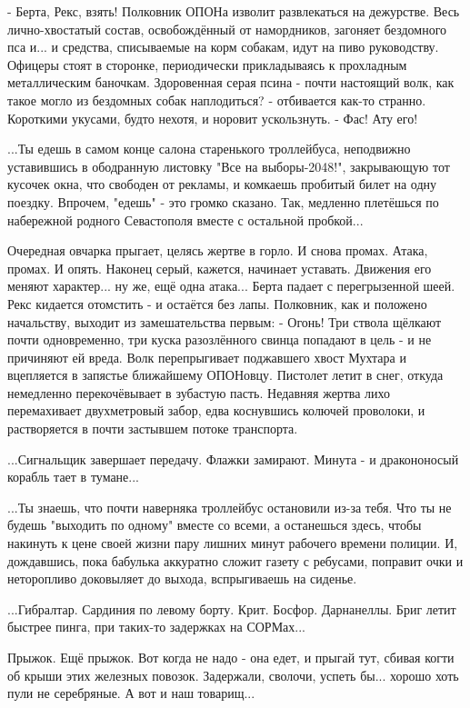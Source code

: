 

 - Берта, Рекс, взять!
Полковник ОПОНа изволит развлекаться на дежурстве. Весь лично-хвостатый состав, освобождённый от намордников, загоняет бездомного пса и... и средства, списываемые на корм собакам, идут на пиво руководству. Офицеры стоят в сторонке, периодически прикладываясь к прохладным металлическим баночкам. Здоровенная серая псина - почти настоящий волк, как такое могло из бездомных собак наплодиться? - отбивается как-то странно. Короткими укусами, будто нехотя, и норовит ускользнуть.
 - Фас! Ату его!


...Ты едешь в самом конце салона старенького троллейбуса, неподвижно уставившись в ободранную листовку "Все на выборы-2048!", закрывающую тот кусочек окна, что свободен от рекламы, и комкаешь пробитый билет на одну поездку. Впрочем, "едешь" - это громко сказано. Так, медленно плетёшься по набережной родного Севастополя вместе с остальной пробкой...


Очередная овчарка прыгает, целясь жертве в горло. И снова промах. Атака, промах. И опять. Наконец серый, кажется, начинает уставать. Движения его меняют характер... ну же, ещё одна атака... Берта падает с перегрызенной шеей. Рекс кидается отомстить - и остаётся без лапы. Полковник, как и положено начальству, выходит из замешательства первым:
 - Огонь!
Три ствола щёлкают почти одновременно, три куска разозлённого свинца попадают в цель - и не причиняют ей вреда. Волк перепрыгивает поджавшего хвост Мухтара и вцепляется в запястье ближайшему ОПОНовцу. Пистолет летит в снег, откуда немедленно перекочёвывает в зубастую пасть. Недавняя жертва лихо перемахивает двухметровый забор, едва коснувшись колючей проволоки, и растворяется в почти застывшем потоке транспорта.


...Сигнальщик завершает передачу. Флажки замирают. Минута - и дракононосый корабль тает в тумане...

...Ты знаешь, что почти наверняка троллейбус остановили из-за тебя. Что ты не будешь "выходить по одному" вместе со всеми, а останешься здесь, чтобы накинуть к цене своей жизни пару лишних минут рабочего времени полиции. И, дождавшись, пока бабулька аккуратно сложит газету с ребусами, поправит очки и неторопливо доковыляет до выхода, вспрыгиваешь на сиденье.

...Гибралтар. Сардиния по левому борту. Крит. Босфор. Дарнанеллы. Бриг летит быстрее пинга, при таких-то задержках на СОРМах...

Прыжок. Ещё прыжок. Вот когда не надо - она едет, и прыгай тут, сбивая когти об крыши этих железных повозок. Задержали, сволочи, успеть бы... хорошо хоть пули не серебряные. А вот и наш товарищ...

